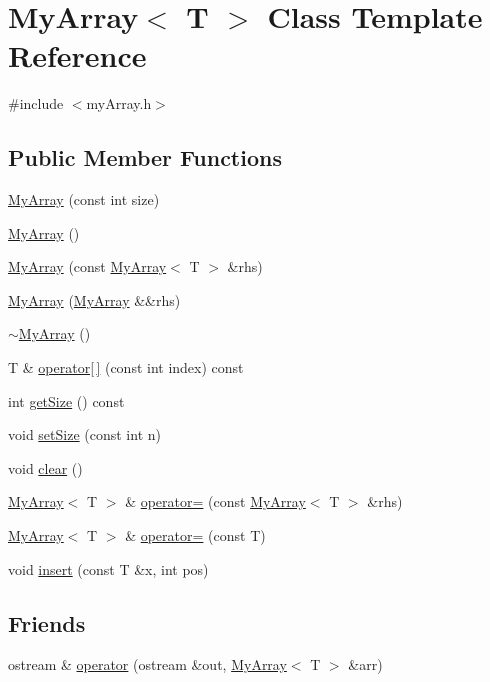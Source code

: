 \hypertarget{classMyArray}{}\section{My\+Array$<$ T $>$ Class Template Reference}
\label{classMyArray}


{\ttfamily \#include $<$my\+Array.\+h$>$}

\subsection*{Public Member Functions}
\begin{DoxyCompactItemize}
\item 
\hyperlink{classMyArray_a5e2f56ae6e3b87c1635bedf8b4b76fb9}{My\+Array} (const int size)
\item 
\hyperlink{classMyArray_acb3cd41349cf47f00e119061894929a6}{My\+Array} ()
\item 
\hyperlink{classMyArray_a03c11ccacb545bdcaf686747d3dc741d}{My\+Array} (const \hyperlink{classMyArray}{My\+Array}$<$ T $>$ \&rhs)
\item 
\hyperlink{classMyArray_a614502f17fa14578ed29c99cb9a9861e}{My\+Array} (\hyperlink{classMyArray}{My\+Array} \&\&rhs)
\item 
\hyperlink{classMyArray_a55bc32d921ca509c9820549cb8baac22}{$\sim$\+My\+Array} ()
\item 
T \& \hyperlink{classMyArray_a29386688c63b9c7694fcaea57e772781}{operator\mbox{[}$\,$\mbox{]}} (const int index) const 
\item 
int \hyperlink{classMyArray_a0b7673af1b2f8d69f9345b3fd817cce4}{get\+Size} () const 
\item 
void \hyperlink{classMyArray_ab2e0c78689ddcfd142dbef361b7c0339}{set\+Size} (const int n)
\item 
void \hyperlink{classMyArray_a631fd2535793febd2f7acd7c70ca94b6}{clear} ()
\item 
\hyperlink{classMyArray}{My\+Array}$<$ T $>$ \& \hyperlink{classMyArray_a2f16f482ff8b1f600d288a9ca04c2658}{operator=} (const \hyperlink{classMyArray}{My\+Array}$<$ T $>$ \&rhs)
\item 
\hyperlink{classMyArray}{My\+Array}$<$ T $>$ \& \hyperlink{classMyArray_a04128aefb2c6a87d84cc29fdc6aeade7}{operator=} (const T)
\item 
void \hyperlink{classMyArray_a0c00635e4361df03eff1c371c1ab5567}{insert} (const T \&x, int pos)
\end{DoxyCompactItemize}
\subsection*{Friends}
\begin{DoxyCompactItemize}
\item 
ostream \& \hyperlink{classMyArray_affe58e61c0c2cd8a54240bb543d827aa}{operator} (ostream \&out, \hyperlink{classMyArray}{My\+Array}$<$ T $>$ \&arr)
\end{DoxyCompactItemize}


